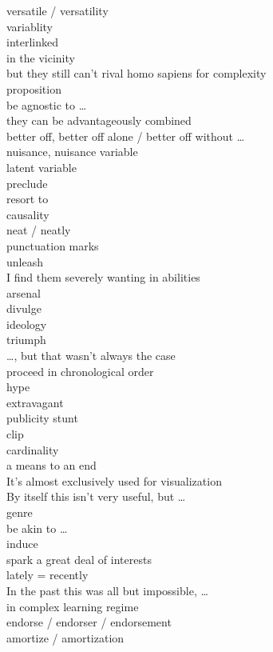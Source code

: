 \documentclass[12pt]{article}
\begin{document}
versatile / versatility\\
variablity  \\
interlinked \\
in the vicinity \\
but they still can't rival homo sapiens for complexity \\
proposition \\
be agnostic to \dots \\
they can be advantageously combined \\
better off, better off alone / better off without \dots \\
nuisance, nuisance variable \\
latent variable \\
preclude \\
resort to \\
causality \\
neat / neatly \\
punctuation marks \\
unleash \\
I find them severely wanting in abilities \\
arsenal \\
divulge \\
ideology \\
triumph \\
\dots, but that wasn't always the case \\
proceed in chronological order \\
hype \\
extravagant \\
publicity stunt \\
clip \\
cardinality \\
a means to an end \\
It’s almost exclusively used for visualization \\
By itself this isn’t very useful, but \dots \\
genre \\
be akin to \dots \\
induce \\
spark a great deal of interests \\
lately = recently \\
In the past this was all but impossible, \dots \\
in complex learning regime \\
endorse / endorser / endorsement \\
amortize / amortization \\
\end{document}
